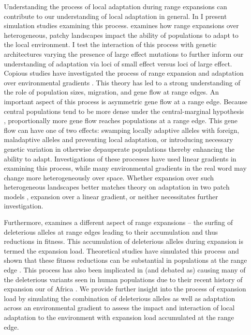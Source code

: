 Understanding the process of local adaptation during range expansions can contribute to our understanding of local adaptation in general. In  I present simulation studies examining this process.  examines how range expansions over heterogeneous, patchy landscapes impact the ability of populations to adapt to the local environment. I test the interaction of this process with genetic architectures varying the presence of large effect mutations to further inform our understanding of adaptation via loci of small effect versus loci of large effect. Copious studies have investigated the process of range expansion and adaptation over environmental gradients \citep{Kirkpatrick:1997, Barton:2001, Bridle:2010, Polechova:2015, GarciaRamos:1997}. This theory has led to a strong understanding of the role of population sizes, migration, and gene flow at range edges. An important aspect of this process is asymmetric gene flow at a range edge. Because central populations tend to be more dense under the central-marginal hypothesis \citep{Brown:1984, Eckert:2008}, proportionally more gene flow reaches populations at a range edge. This gene flow can have one of two effects: swamping locally adaptive alleles with foreign, maladaptive alleles and preventing local adaptation, or introducing necessary genetic variation in otherwise depauperate populations thereby enhancing the ability to adapt. Investigations of these processes have used linear gradients in examining this process, while many environmental gradients in the real word may change more heterogeneously over space. Whether expansion over such heterogeneous landscapes better matches theory on adaptation in two patch models \citep{Gomulkiewicz:1995, Ronce:2001, Holt:1997, Gomulkiewicz:1999}, expansion over a linear gradient, or neither necessitates further investigation.

Furthermore,  examines a different aspect of range expansions -- the surfing of deleterious alleles at range edges leading to their accumulation and thus reductions in fitness. This accumulation of deleterious alleles during expansion is termed the expansion load. Theoretical studies have simulated this process and shown that these fitness reductions can be substantial in populations at the range edge \citep{Peischl:2013, Peischl:2015, Peischl:2015b}. This process has also been implicated in (and debated as) causing many of the deleterious variants seen in human populations due to their recent history of expansion our of Africa \citep{Henn:2015, Henn:2015b, Lohmueller:2008, Lohmueller:2014b, Do:2015}. We provide further insight into the process of expansion load by simulating the combination of deleterious alleles as well as adaptation across an environmental gradient to assess the impact and interaction of local adaptation to the environment with expansion load accumulated at the range edge.


